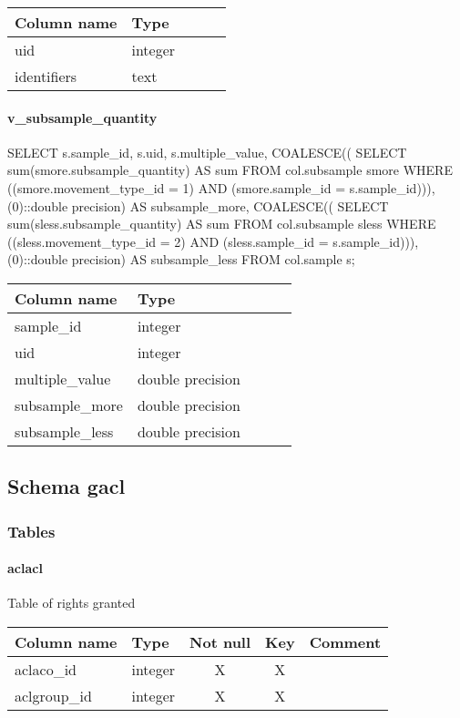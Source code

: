 \begin{tabular}{|l| p{2cm}|c|c| p{5cm}|}
\hline
Column name & Type \\
\hline
uid & integer\\
identifiers & text\\
\hline
\end{tabular}
\paragraph{v\_subsample\_quantity}
 SELECT s.sample\_id,
    s.uid,
    s.multiple\_value,
    COALESCE(( SELECT sum(smore.subsample\_quantity) AS sum
           FROM col.subsample smore
          WHERE ((smore.movement\_type\_id = 1) AND (smore.sample\_id = s.sample\_id))), (0)::double precision) AS subsample\_more,
    COALESCE(( SELECT sum(sless.subsample\_quantity) AS sum
           FROM col.subsample sless
          WHERE ((sless.movement\_type\_id = 2) AND (sless.sample\_id = s.sample\_id))), (0)::double precision) AS subsample\_less
   FROM col.sample s;

\begin{tabular}{|l| p{2cm}|c|c| p{5cm}|}
\hline
Column name & Type \\
\hline
sample\_id & integer\\
uid & integer\\
multiple\_value & double precision\\
subsample\_more & double precision\\
subsample\_less & double precision\\
\hline
\end{tabular}
\subsection{Schema gacl}
\subsubsection{Tables}
\paragraph{aclacl}
Table of rights granted

\begin{tabular}{|l| p{2cm}|c|c| p{5cm}|}
\hline
Column name & Type & Not null & Key & Comment \\
\hline
aclaco\_id & integer & X & X & \\
aclgroup\_id & integer & X & X & \\
\hline
\end{tabular}
